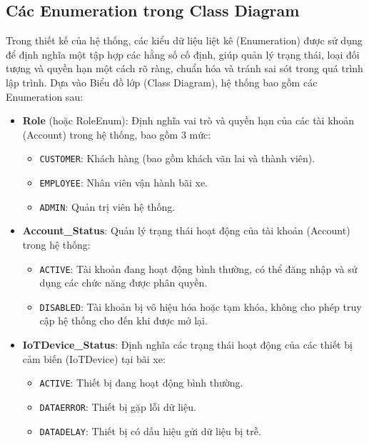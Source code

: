 \subsection{Các Enumeration trong Class Diagram}

Trong thiết kế của hệ thống, các kiểu dữ liệu liệt kê (Enumeration) được sử dụng để định nghĩa một tập hợp các hằng số cố định, giúp quản lý trạng thái, loại đối tượng và quyền hạn một cách rõ ràng, chuẩn hóa và tránh sai sót trong quá trình lập trình. Dựa vào Biểu đồ lớp (Class Diagram), hệ thống bao gồm các Enumeration sau:

\begin{itemize}
    \item \textbf{Role} (hoặc RoleEnum): Định nghĩa vai trò và quyền hạn của các tài khoản (Account) trong hệ thống, bao gồm 3 mức:
    \begin{itemize}
        \item \texttt{CUSTOMER}: Khách hàng (bao gồm khách vãn lai và thành viên).
        \item \texttt{EMPLOYEE}: Nhân viên vận hành bãi xe.
        \item \texttt{ADMIN}: Quản trị viên hệ thống.
    \end{itemize}

    \item \textbf{Account\_Status}: Quản lý trạng thái hoạt động của tài khoản (Account) trong hệ thống:
    \begin{itemize}
        \item \texttt{ACTIVE}: Tài khoản đang hoạt động bình thường, có thể đăng nhập và sử dụng các chức năng được phân quyền.
        \item \texttt{DISABLED}: Tài khoản bị vô hiệu hóa hoặc tạm khóa, không cho phép truy cập hệ thống cho đến khi được mở lại.
    \end{itemize}

    \item \textbf{IoTDevice\_Status}: Định nghĩa các trạng thái hoạt động của các thiết bị cảm biến (IoTDevice) tại bãi xe:
    \begin{itemize}
        \item \texttt{ACTIVE}: Thiết bị đang hoạt động bình thường.
        \item \texttt{DATAERROR}: Thiết bị gặp lỗi dữ liệu.
        \item \texttt{DATADELAY}: Thiết bị có dấu hiệu gửi dữ liệu bị trễ.
    \end{itemize}


\end{itemize}
